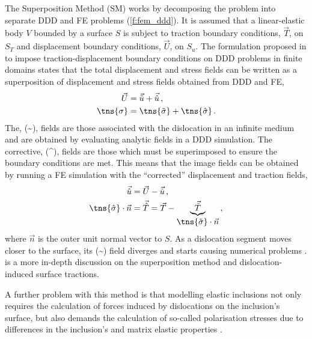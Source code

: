The Superposition Method (SM) works by decomposing the problem into separate DDD and FE problems (\cref{f:fem_ddd}). It is assumed that a linear-elastic body $ V $ bounded by a surface $ S $ is subject to traction boundary conditions, $ \vec{T} $, on $ S_{T} $ and displacement boundary conditions, $ \vec{U} $, on $ S_{u} $. The formulation proposed in \cite{dismot} to impose traction-displacement boundary conditions on DDD problems in finite domains states that the total displacement and stress fields can be written as a superposition of displacement and stress fields obtained from DDD and FE,
\begin{subequations}
    \label{eq:superposition}
    \begin{align}
        \vec{U}      & = \vec{\tilde{u}} + \vec{\hat{u}}\,,            \\
        \tns{\sigma} & = \tns{\tilde{\sigma}} + \tns{\hat{\sigma}}\, .
    \end{align}
\end{subequations}
The, (\textasciitilde), fields are those associated with the dislocation in an infinite medium and are obtained by evaluating analytic fields in a DDD simulation. The corrective, (\textasciicircum), fields are those which must be superimposed to ensure the boundary conditions are met. This means that the image fields can be obtained by running a FE simulation with the ``corrected'' displacement and traction fields,
\begin{subequations}
    \begin{align}
        \vec{\hat{u}}                    & = \vec{U} - \vec{\tilde{u}}\,,                                                                                 \\
        \tns{\hat{\sigma}} \cdot \vec{n} & = \vec{\hat{T}} = \vec{T} - \underbrace{\vec{\tilde{T}}}_{\displaystyle{\tns{\tilde{\sigma}}}\cdot \vec{n}}\,,
    \end{align}
\end{subequations}
where $ \vec{n} $ is the outer unit normal vector to $ S $. As a dislocation segment moves closer to the surface, its (\textasciitilde) field diverges and starts causing numerical problems \cite{bdd}.  is a more in-depth discussion on the superposition method and dislocation-induced surface tractions.

A further problem with this method is that modelling elastic inclusions not only requires the calculation of forces induced by dislocations on the inclusion's surface, but also demands the calculation of so-called polarisation stresses due to differences in the inclusion's and matrix elastic properties \cite{dismot, bdd, ddd_precip}.


